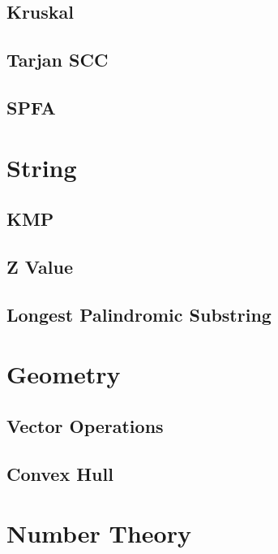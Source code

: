 \documentclass[twocolumn]{article}
\begin{document}
\subsection{Kruskal}


\subsection{Tarjan SCC}


\subsection{SPFA}


\section{String}

\subsection{KMP}


\subsection{Z Value}


\subsection{Longest Palindromic Substring}


\section{Geometry}

\subsection{Vector Operations}


\subsection{Convex Hull}


\section{Number Theory}
\end{document}

